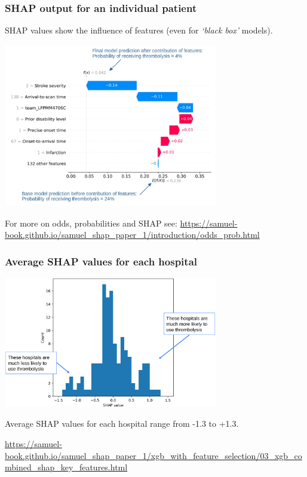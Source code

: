 \documentclass[xcolor={usenames,dvipsnames}]{beamer}
\newcommand{\smallurl}[1]{\textcolor{blue}{\fontsize{4pt}{4.8pt}\selectfont \url{#1}}}
\begin{document}
\begin{frame}
\frametitle{SHAP output for an individual patient}

\footnotesize{SHAP values show the influence of features (even for \emph{`black box'} models).}

\begin{center} 
\includegraphics[width=0.7\textwidth]{./images/shap_output_for_individual_patient}
\end{center}


{\tiny For more on odds, probabilities and SHAP see: }
\smallurl{https://samuel-book.github.io/samuel_shap_paper_1/introduction/odds_prob.html}


\end{frame}





\begin{frame}
\frametitle{Average SHAP values for each hospital}


\begin{center} 
\includegraphics[width=0.7\textwidth]{./images/shap_average_per_hospital_annotated}
\end{center}


Average SHAP values for each hospital range from -1.3 to +1.3.

\vspace{1em}

\smallurl{https://samuel-book.github.io/samuel_shap_paper_1/xgb_with_feature_selection/03_xgb_combined_shap_key_features.html}

\end{frame}
\end{document}
